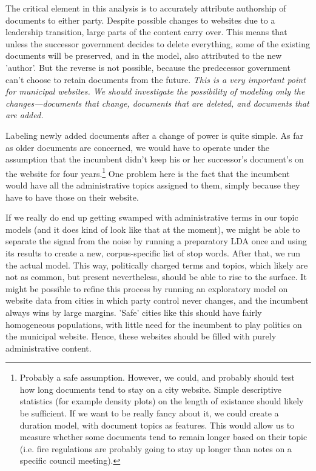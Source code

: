 \documentclass[11pt]{article}
\begin{document}
The critical element in this analysis is to accurately attribute authorship of documents to either party. Despite possible changes to websites due to a leadership transition, large parts of the content carry over. This means that unless the successor government decides to delete everything, some of the existing documents will be preserved, and in the model, also attributed to the new 'author'. But the reverse is not possible, because the predecessor government can't choose to retain documents from the future. {\em  This is a very important point for municipal websites. We should investigate the possibility of modeling only the changes---documents that change, documents that are deleted, and documents that are added. }

Labeling newly added documents after a change of power is quite simple. As far as older documents are concerned, we would have to operate under the assumption that the incumbent didn't keep his or her successor's document's on the website for four years.\footnote{Probably a safe assumption. However, we could, and probably should test how long documents tend to stay on a city website. Simple descriptive statistics (for example density plots) on the length of existance should likely be sufficient. If we want to be really fancy about it, we could create a duration model, with document topics as features. This would allow us to measure whether some documents tend to remain longer based on their topic (i.e. fire regulations are probably going to stay up longer than notes on a specific council meeting).} One problem here is the fact that the incumbent would have all the administrative topics assigned to them, simply because they have to have those on their website.

If we really do end up getting swamped with administrative terms in our topic models (and it does kind of look like that at the moment), we might be able to separate the signal from the noise by running a preparatory LDA once and using its results to create a new, corpus-specific list of stop words. After that, we run the actual model. This way, politically charged terms and topics, which likely are not as common, but present nevertheless, should be able to rise to the surface. It might be possible to refine this process by running an exploratory model on website data from cities in which party control never changes, and the incumbent always wins by large margins. 'Safe' cities like this should have fairly homogeneous populations, with little need for the incumbent to play politics on the municipal website. Hence, these websites should be filled with purely administrative content.
\end{document}
